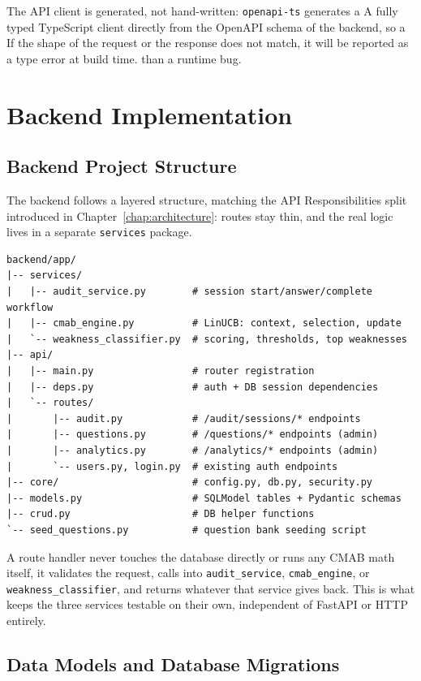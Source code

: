 \documentclass[a4paper, 12pt, oneside, openany, BCOR1cm,toc=chapterentrywithdots]{scrbook}
\begin{document}
The API client is generated, not hand-written: \texttt{openapi-ts} generates a A fully typed
TypeScript client directly from the OpenAPI schema of the backend, so a If the shape of the
request or the response does not match, it will be reported as a type error at build time. than
a runtime bug.

\section{Backend Implementation}
\subsection{Backend Project Structure}

The backend follows a layered structure, matching the API Responsibilities split introduced in
Chapter~\ref{chap:architecture}: routes stay thin, and the real logic lives in a separate
\texttt{services} package.

\begin{verbatim}
backend/app/
|-- services/
|   |-- audit_service.py        # session start/answer/complete workflow
|   |-- cmab_engine.py          # LinUCB: context, selection, update
|   `-- weakness_classifier.py  # scoring, thresholds, top weaknesses
|-- api/
|   |-- main.py                 # router registration
|   |-- deps.py                 # auth + DB session dependencies
|   `-- routes/
|       |-- audit.py            # /audit/sessions/* endpoints
|       |-- questions.py        # /questions/* endpoints (admin)
|       |-- analytics.py        # /analytics/* endpoints (admin)
|       `-- users.py, login.py  # existing auth endpoints
|-- core/                       # config.py, db.py, security.py
|-- models.py                   # SQLModel tables + Pydantic schemas
|-- crud.py                     # DB helper functions
`-- seed_questions.py           # question bank seeding script
\end{verbatim}

A route handler never touches the database directly or runs any CMAB math itself, it validates
the request, calls into \texttt{audit\_service}, \texttt{cmab\_engine}, or
\texttt{weakness\_classifier}, and returns whatever that service gives back. This is what keeps
the three services testable on their own, independent of FastAPI or HTTP entirely.

\subsection{Data Models and Database Migrations}
\end{document}
